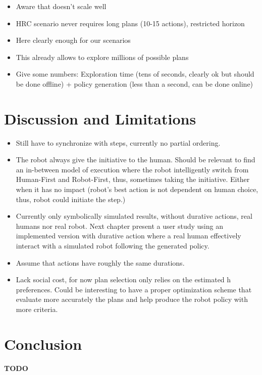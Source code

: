 \begin{itemize}
    \item Aware that doesn't scale well
    \item HRC scenario never requires long plans (10-15 actions), restricted horizon
    \item Here clearly enough for our scenarios
    \item This already allows to explore millions of possible plans
    \item Give some numbers: Exploration time (tens of seconds, clearly ok but should be done offline) + policy generation (less than a second, can be done online) 
\end{itemize}

\section{Discussion and Limitations}

\begin{itemize}
    \item Still have to synchronize with steps, currently no partial ordering. 
    \item The robot always give the initiative to the human. Should be relevant to find an in-between model of execution where the robot intelligently switch from Human-First and Robot-First, thus, sometimes taking the initiative. Either when it has no impact (robot's best action is not dependent on human choice, thus, robot could initiate the step.)
    \item Currently only symbolically simulated results, without durative actions, real humans nor real robot. Next chapter present a user study using an implemented version with durative action where a real human effectively interact with a simulated robot following the generated policy. 
    \item Assume that actions have roughly the same durations.
    \item Lack social cost, for now plan selection only relies on the estimated h preferences. Could be interesting to have a proper optimization scheme that evaluate more accurately the plans and help produce the robot policy with more criteria.
\end{itemize}


\section{Conclusion}

\textbf{TODO}




